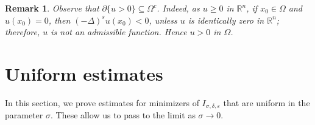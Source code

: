 \documentclass[11pt, reqno]{amsart}
\newtheorem{remark}{Remark}
\numberwithin{equation}{section}
\numberwithin{theorem}{section}
\numberwithin{lemma}{section}
\numberwithin{corollary}{section}
\numberwithin{remark}{section}
\numberwithin{proposition}{section}
\numberwithin{definition}{section}
\newcommand{\R}{\mathbb{R}}
\begin{document}
\begin{remark}\label{r2.2}
	Observe that $\partial\{u>0\}\subseteq\Omega^c$. Indeed, as $u\geq0$ in $\R^n$, if $x_0\in\Omega$ and $u(x_0)=0$, then $(-\Delta)^su(x_0)<0$, unless $u$ is identically zero in $\R^n$; therefore, $u$ is not an admissible function. Hence $u>0$ in $\Omega$.
\end{remark}

\smallskip

\section{Uniform estimates}\label{s3}
In this section, we prove estimates for minimizers of $I_{\sigma,\delta,\varepsilon}$ that are uniform in the parameter $\sigma$. These allow us to pass to the limit as $\sigma\to0$.
\end{document}
